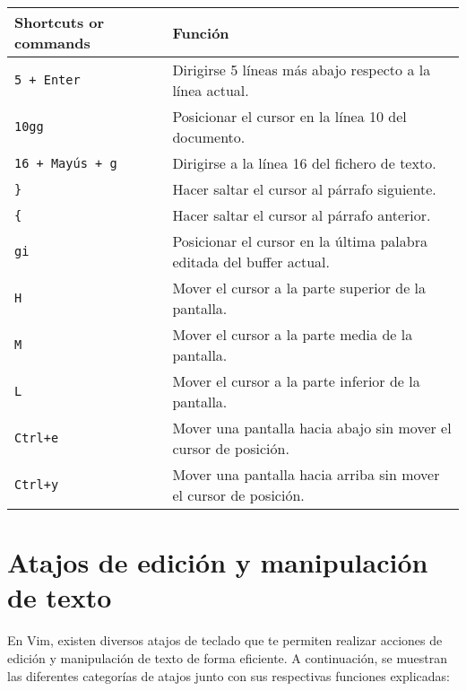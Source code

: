 \documentclass[
  doc,
  floatsintext,
  longtable,
  a4paper,
  nolmodern,
  notxfonts,
  notimes,
  colorlinks=true,linkcolor=blue,citecolor=blue,urlcolor=blue]{apa7}
\begin{document}
\begin{longtable}[]{@{}
  >{\raggedright\arraybackslash}p{}
  >{\raggedright\arraybackslash}p{}@{}}
\toprule\noalign{}
\begin{minipage}[b]{\linewidth}\raggedright
Shortcuts or commands
\end{minipage} & \begin{minipage}[b]{\linewidth}\raggedright
Función
\end{minipage} \\
\midrule\noalign{}
\endhead
\bottomrule\noalign{}
\endlastfoot
\texttt{5\ +\ Enter} & Dirigirse 5 líneas más abajo respecto a la línea
actual. \\
\texttt{10gg} & Posicionar el cursor en la línea 10 del documento. \\
\texttt{16\ +\ Mayús\ +\ g} & Dirigirse a la línea 16 del fichero de
texto. \\
\texttt{\}} & Hacer saltar el cursor al párrafo siguiente. \\
\texttt{\{} & Hacer saltar el cursor al párrafo anterior. \\
\texttt{gi} & Posicionar el cursor en la última palabra editada del
buffer actual. \\
\texttt{H} & Mover el cursor a la parte superior de la pantalla. \\
\texttt{M} & Mover el cursor a la parte media de la pantalla. \\
\texttt{L} & Mover el cursor a la parte inferior de la pantalla. \\
\texttt{Ctrl+e} & Mover una pantalla hacia abajo sin mover el cursor de
posición. \\
\texttt{Ctrl+y} & Mover una pantalla hacia arriba sin mover el cursor de
posición. \\
\end{longtable}

\section{Atajos de edición y manipulación de
texto}\label{atajos-de-ediciuxf3n-y-manipulaciuxf3n-de-texto}

En Vim, existen diversos atajos de teclado que te permiten realizar
acciones de edición y manipulación de texto de forma eficiente. A
continuación, se muestran las diferentes categorías de atajos junto con
sus respectivas funciones explicadas:
\end{document}
